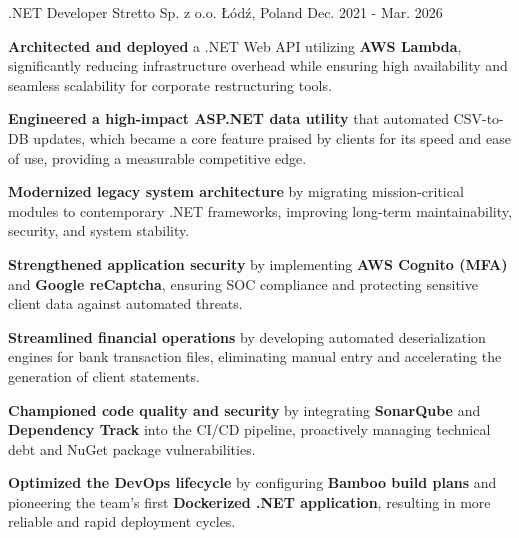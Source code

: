 

\begin{cventries}

  \cventry
    {.NET Developer} %
    {Stretto Sp. z o.o.} %
    {Łódź, Poland} %
    {Dec. 2021 - Mar. 2026} %
    {
      \begin{cvitems} %
        \item {\textbf{Architected and deployed} a .NET Web API utilizing \textbf{AWS Lambda}, significantly reducing infrastructure overhead while ensuring high availability and seamless scalability for corporate restructuring tools.}
        \item {\textbf{Engineered a high-impact ASP.NET data utility} that automated CSV-to-DB updates, which became a core feature praised by clients for its speed and ease of use, providing a measurable competitive edge.}
        \item {\textbf{Modernized legacy system architecture} by migrating mission-critical modules to contemporary .NET frameworks, improving long-term maintainability, security, and system stability.}
        \item {\textbf{Strengthened application security} by implementing \textbf{AWS Cognito (MFA)} and \textbf{Google reCaptcha}, ensuring SOC compliance and protecting sensitive client data against automated threats.}
        \item {\textbf{Streamlined financial operations} by developing automated deserialization engines for bank transaction files, eliminating manual entry and accelerating the generation of client statements.}
        \item {\textbf{Championed code quality and security} by integrating \textbf{SonarQube} and \textbf{Dependency Track} into the CI/CD pipeline, proactively managing technical debt and NuGet package vulnerabilities.}
        \item {\textbf{Optimized the DevOps lifecycle} by configuring \textbf{Bamboo build plans} and pioneering the team's first \textbf{Dockerized .NET application}, resulting in more reliable and rapid deployment cycles.}
      \end{cvitems}
    }


\end{cventries}
